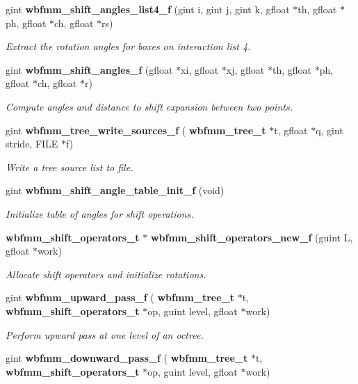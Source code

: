 \begin{DoxyCompactItemize}
gint \textbf{ wbfmm\+\_\+shift\+\_\+angles\+\_\+list4\+\_\+f} (gint i, gint j, gint k, gfloat $\ast$th, gfloat $\ast$ph, gfloat $\ast$ch, gfloat $\ast$rs)
\begin{DoxyCompactList}\small\item\em Extract the rotation angles for boxes on interaction list 4. \end{DoxyCompactList}\item 
gint \textbf{ wbfmm\+\_\+shift\+\_\+angles\+\_\+f} (gfloat $\ast$xi, gfloat $\ast$xj, gfloat $\ast$th, gfloat $\ast$ph, gfloat $\ast$ch, gfloat $\ast$r)
\begin{DoxyCompactList}\small\item\em Compute angles and distance to shift expansion between two points. \end{DoxyCompactList}\item 
gint \textbf{ wbfmm\+\_\+tree\+\_\+write\+\_\+sources\+\_\+f} (\textbf{ wbfmm\+\_\+tree\+\_\+t} $\ast$t, gfloat $\ast$q, gint stride, F\+I\+LE $\ast$f)
\begin{DoxyCompactList}\small\item\em Write a tree source list to file. \end{DoxyCompactList}\item 
gint \textbf{ wbfmm\+\_\+shift\+\_\+angle\+\_\+table\+\_\+init\+\_\+f} (void)
\begin{DoxyCompactList}\small\item\em Initialize table of angles for shift operations. \end{DoxyCompactList}\item 
\textbf{ wbfmm\+\_\+shift\+\_\+operators\+\_\+t} $\ast$ \textbf{ wbfmm\+\_\+shift\+\_\+operators\+\_\+new\+\_\+f} (guint L, gfloat $\ast$work)
\begin{DoxyCompactList}\small\item\em Allocate shift operators and initialize rotations. \end{DoxyCompactList}\item 
gint \textbf{ wbfmm\+\_\+upward\+\_\+pass\+\_\+f} (\textbf{ wbfmm\+\_\+tree\+\_\+t} $\ast$t, \textbf{ wbfmm\+\_\+shift\+\_\+operators\+\_\+t} $\ast$op, guint level, gfloat $\ast$work)
\begin{DoxyCompactList}\small\item\em Perform upward pass at one level of an octree. \end{DoxyCompactList}\item 
gint \textbf{ wbfmm\+\_\+downward\+\_\+pass\+\_\+f} (\textbf{ wbfmm\+\_\+tree\+\_\+t} $\ast$t, \textbf{ wbfmm\+\_\+shift\+\_\+operators\+\_\+t} $\ast$op, guint level, gfloat $\ast$work)

\end{DoxyCompactItemize}
